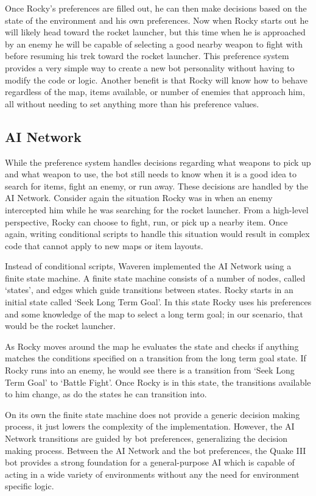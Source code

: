Once Rocky's preferences are filled out, he can then make decisions based on the state of the environment and his own preferences. Now when Rocky starts out he will likely head toward the rocket launcher, but this time when he is approached by an enemy he will be capable of selecting a good nearby weapon to fight with before resuming his trek toward the rocket launcher. This preference system provides a very simple way to create a new bot personality without having to modify the code or logic. Another benefit is that Rocky will know how to behave regardless of the map, items available, or number of enemies that approach him, all without needing to set anything more than his preference values.

\subsection{AI Network}

While the preference system handles decisions regarding what weapons to pick up and what weapon to use, the bot still needs to know when it is a good idea to search for items, fight an enemy, or run away. These decisions are handled by the AI Network. Consider again the situation Rocky was in when an enemy intercepted him while he was searching for the rocket launcher. From a high-level perspective, Rocky can choose to fight, run, or pick up a nearby item. Once again, writing conditional scripts to handle this situation would result in complex code that cannot apply to new maps or item layouts.

Instead of conditional scripts, Waveren implemented the AI Network using a finite state machine. \cite{q3bot} A finite state machine consists of a number of nodes, called  `states', and edges which guide transitions between states. Rocky starts in an initial state called `Seek Long Term Goal'. In this state Rocky uses his preferences and some knowledge of the map to select a long term goal; in our scenario, that would be the rocket launcher. 

As Rocky moves around the map he evaluates the state and checks if anything matches the conditions specified on a transition from the long term goal state. If Rocky runs into an enemy, he would see there is a transition from `Seek Long Term Goal' to `Battle Fight'. Once Rocky is in this state, the transitions available to him change, as do the states he can transition into. 

On its own the finite state machine does not provide a generic decision making process, it just lowers the complexity of the implementation. However, the AI Network transitions are guided by bot preferences, generalizing the decision making process. Between the AI Network and the bot preferences, the Quake III bot provides a strong foundation for a general-purpose AI which is capable of acting in a wide variety of environments without any the need for environment specific logic.

